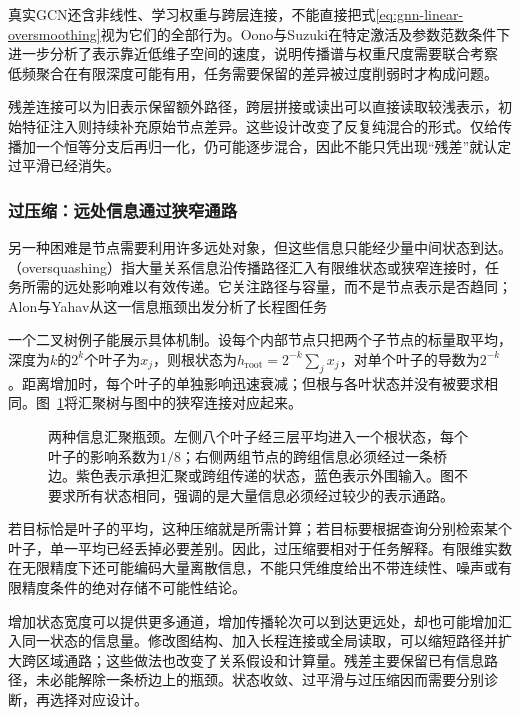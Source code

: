 真实GCN还含非线性、学习权重与跨层连接，不能直接把式\eqref{eq:gnn-linear-oversmoothing}视为它们的全部行为。Oono与Suzuki在特定激活及参数范数条件下进一步分析了表示靠近低维子空间的速度，说明传播谱与权重尺度需要联合考察 低频聚合在有限深度可能有用，任务需要保留的差异被过度削弱时才构成问题。

残差连接可以为旧表示保留额外路径，跨层拼接或读出可以直接读取较浅表示，初始特征注入则持续补充原始节点差异。这些设计改变了反复纯混合的形式。仅给传播加一个恒等分支后再归一化，仍可能逐步混合，因此不能只凭出现“残差”就认定过平滑已经消失。

\subsubsection{过压缩：远处信息通过狭窄通路}
\label{sec:gnn-oversquashing}

另一种困难是节点需要利用许多远处对象，但这些信息只能经少量中间状态到达。（oversquashing）指大量关系信息沿传播路径汇入有限维状态或狭窄连接时，任务所需的远处影响难以有效传递。它关注路径与容量，而不是节点表示是否趋同；Alon与Yahav从这一信息瓶颈出发分析了长程图任务

一个二叉树例子能展示具体机制。设每个内部节点只把两个子节点的标量取平均，深度为$k$的$2^k$个叶子为$x_j$，则根状态为$h_{\mathrm{root}}=2^{-k}\sum_jx_j$，对单个叶子的导数为$2^{-k}$。距离增加时，每个叶子的单独影响迅速衰减；但根与各叶状态并没有被要求相同。图~\ref{fig:gnn-bottleneck}将汇聚树与图中的狭窄连接对应起来。

\begin{figure}[htb]
  \centering
  
  \caption{两种信息汇聚瓶颈。左侧八个叶子经三层平均进入一个根状态，每个叶子的影响系数为$1/8$；右侧两组节点的跨组信息必须经过一条桥边。紫色表示承担汇聚或跨组传递的状态，蓝色表示外围输入。图不要求所有状态相同，强调的是大量信息必须经过较少的表示通路。}
  \label{fig:gnn-bottleneck}
\end{figure}

若目标恰是叶子的平均，这种压缩就是所需计算；若目标要根据查询分别检索某个叶子，单一平均已经丢掉必要差别。因此，过压缩要相对于任务解释。有限维实数在无限精度下还可能编码大量离散信息，不能只凭维度给出不带连续性、噪声或有限精度条件的绝对存储不可能性结论。

增加状态宽度可以提供更多通道，增加传播轮次可以到达更远处，却也可能增加汇入同一状态的信息量。修改图结构、加入长程连接或全局读取，可以缩短路径并扩大跨区域通路；这些做法也改变了关系假设和计算量。残差主要保留已有信息路径，未必能解除一条桥边上的瓶颈。状态收敛、过平滑与过压缩因而需要分别诊断，再选择对应设计。

